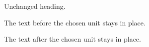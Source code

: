 \documentclass[11pt]{article}
\begin{document}
Unchanged heading.

The text before the chosen unit stays in place.



\par\vspace{25mm}
The text after the chosen unit stays in place.
\end{document}
